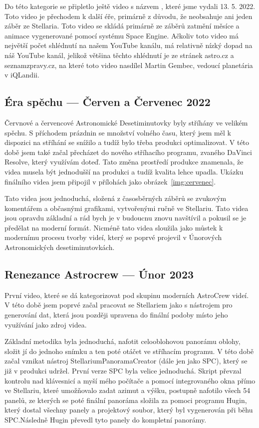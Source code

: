\documentclass[12pt,a4paper,titlepage]{article}
\begin{document}
Do této kategorie se připletlo ještě video s názvem , které jsme vydali 13. 5. 2022. Toto video je přechodem k další éře, primárně z důvodu, že neobsahuje ani jeden záběr ze Stellaria. Toto video se skládá primárně ze záběrů zatmění měsíce a animace vygenerované pomocí systému Space Engine. Ačkoliv toto video má největší počet shlédnutí na našem YouTube kanálu, má relativně nízký dopad na náš YouTube kanál, jelikož většina těchto shlédnutí je ze stránek astro.cz a seznamzpravy.cz, na které toto video nasdílel Martin Gembec, vedoucí planetária v iQLandii.
\subsection{Éra spěchu --- Červen a Červenec 2022}
Červnové a červencové Astronomické Desetiminutovky byly stříhány ve velikém spěchu. S příchodem prázdnin se množství volného času, který jsem měl k dispozici na stříhání se snížilo a tudíž bylo třeba produkci optimalizovat. V této době jsem také začal přecházet do nového stříhacího programu, zvaného DaVinci Resolve, který využívám doteď. Tato změna prostředí produkce znamenala, že videa musela být jednodušší na produkci a tudíž kvalita lehce upadla. Ukázku finálního videa jsem připojil v přílohách jako obrázek~\ref{img:cervenec}.

Tato videa jsou jednoduchá, složená z časosběrných záběrů se zvukovým komentářem a občasnými grafikami, vytvořenými ručně ve Stellariu. Tato videa jsou opravdu základní a rád bych je v budoucnu znovu navštívil a pokusil se je předělat na moderní formát. Nicméně tato videa sloužila jako můstek k modernímu procesu tvorby videí, který se poprvé projevil v Únorových Astronomických desetiminutovkách.
\subsection{Renezance Astrocrew --- Únor 2023}
První video, které se dá kategorizovat pod skupinu moderních AstroCrew videí. V této době jsem poprvé začal pracovat se Stellariem jako s nástrojem pro generování dat, která jsou později upravena do finální podoby místo jeho využívání jako zdroj videa. 

Základní metodika byla jednoduchá, nafotit celooblohovou panorámu oblohy, složit jí do jednoho snímku a ten poté otáčet ve stříhacím programu. V této době začal vznikat nástroj StellariumPanoramaCreator (dále jen jako SPC), který se již v produkci udržel. První verze SPC byla velice jednoduchá. Skript převzal kontrolu nad klávesnicí a myší mého počítače a pomocí integrovaného okna přímo ve Stellariu, které umožňovalo zadat azimut a výšku, postupně nafotilo všech 54 panelů, ze kterých se poté finální panoráma složila za pomoci programu Hugin, který dostal všechny panely a projektový soubor, který byl vygenerován při běhu SPC.\@ Následně Hugin převedl tyto panely do kompletní panorámy.
\end{document}
